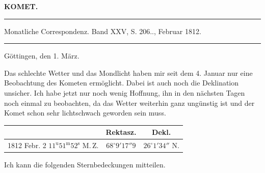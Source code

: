 \clearpage{}\hypertarget{native-352-lower}{}\label{native-352-lower}
\begin{center}\textbf{KOMET.}\par\vspace{4pt}\hrule\vspace{4pt}\fontsize{10}{12}\selectfont Monatliche Correspondenz. Band XXV, S. 206\;.., Februar 1812.\par\vspace{4pt}\hrule\vspace{4pt}\end{center}

\begin{flushright}Göttingen, den 1. März.\end{flushright}
\par\indent Das schlechte Wetter und das Mondlicht haben mir seit dem 4. Januar nur eine Beobachtung des Kometen ermöglicht. Dabei ist auch noch die Deklination unsicher. Ich habe jetzt nur noch wenig Hoffnung, ihn in den nächsten Tagen noch einmal zu beobachten, da das Wetter weiterhin ganz ungünstig ist und der Komet schon sehr lichtschwach geworden sein muss.

\begin{center}
\fontsize{10}{12}\selectfont\setlength{\tabcolsep}{4pt}\begin{tabular}{l|c|c}
 & Rektasz. & Dekl. \\
\hline
1812 Febr. 2 \quad $11^{\mathrm{u}}51^{\mathrm{m}}52^{\mathrm{s}}$ M.\,Z. & $68^\circ9'17''9$ & $26^\circ1'34''$ N. \\
\end{tabular}
\end{center}

\par\indent Ich kann die folgenden Sternbedeckungen mitteilen.

